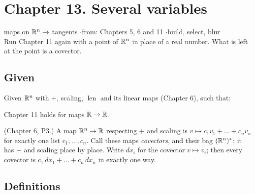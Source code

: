 \newpage

\section*{Chapter 13. Several variables}
\begin{center}
{\normalsize maps on $\mathbb{R}^n \to$ tangents \quad$\cdot$\quad from: Chapters 5, 6 and 11 \quad$\cdot$\quad build, select, blur}\\[4pt]
{\small Run Chapter 11 again with a point of $\mathbb{R}^n$ in place of a real number. What is left at the point is a covector.}
\end{center}

\subsection*{Given}

Given $\mathbb{R}^n$ with $+$, scaling, $\operatorname{len}$ and its linear maps (Chapter 6), such that:
\begin{lines}
\item[\lab{G1}] Chapter 11 holds for maps $\mathbb{R} \to \mathbb{R}$.
\item[\lab{G2}] (Chapter 6, P3.) A map $\mathbb{R}^n \to \mathbb{R}$ respecting $+$ and scaling is $v \mapsto c_1 v_1 + \dots + c_n v_n$ for exactly one list $c_1, \dots, c_n$. Call these maps \emph{covectors}, and their bag $(\mathbb{R}^n)^*$; it has $+$ and scaling place by place. Write $dx_i$ for the covector $v \mapsto v_i$; then every covector is $c_1\,dx_1 + \dots + c_n\,dx_n$ in exactly one way.
\end{lines}

\subsection*{Definitions}

